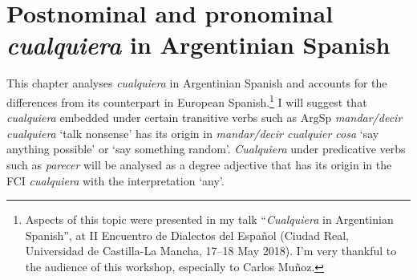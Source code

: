\chapter{{Postnominal} {and} {pronominal} {\textit{cualquiera} }{in} {Argentinian} {Spanish}}\label{sec:4}

This chapter analyses \textit{cualquiera} in Argentinian Spanish and accounts for the differences from its counterpart in European Spanish.\footnote{{Aspects of this topic were presented in my talk “}{\textit{Cualquiera}} {in Argentinian Spanish”, at II Encuentro de Dialectos del Español (Ciudad Real, Universidad de Castilla-La Mancha, 17–18 May 2018). I’m very thankful to the audience of this workshop, especially to Carlos Muñoz.}} I will suggest that \textit{cualquiera} embedded under certain transitive verbs such as ArgSp \textit{mandar/decir cualquiera} ‘talk nonsense’ has its origin in \textit{mandar/decir cualquier cosa} ‘say anything possible’ or ‘say something random’. \textit{Cualquiera} under predicative verbs such as \textit{parecer} will be analysed as a degree adjective that has its origin in the FCI \textit{cualquiera} with the interpretation ‘any’.

